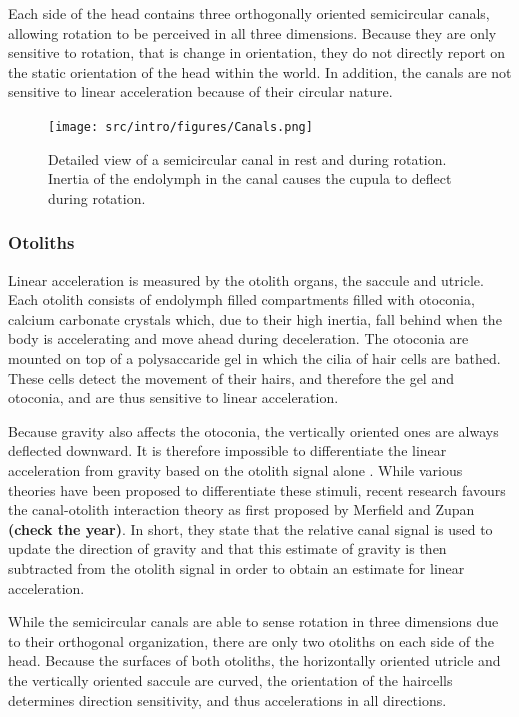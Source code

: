 Each side of the head contains three orthogonally oriented semicircular canals, allowing rotation to be perceived in all three dimensions. Because they are only sensitive to rotation, that is change in orientation, they do not directly report on the static orientation of the head within the world. In addition, the canals are not sensitive to linear acceleration because of their circular nature.

\begin{figure}
    \texttt{[image: src/intro/figures/Canals.png]}
    \caption{Detailed view of a semicircular canal  in rest and  during rotation. Inertia of the endolymph in the canal causes the cupula to deflect during rotation.}
    \label{intro:fig3}
\end{figure}


\subsubsection{Otoliths}
Linear acceleration is measured by the otolith organs, the saccule and utricle. Each otolith consists of endolymph filled compartments filled with otoconia, calcium carbonate crystals which, due to their high inertia, fall behind when the body is accelerating and move ahead during deceleration. The otoconia are mounted on top of a polysaccaride gel in which the cilia of hair cells are bathed. These cells detect the movement of their hairs, and therefore the gel and otoconia, and are thus sensitive to linear acceleration.

Because gravity also affects the otoconia, the vertically oriented ones are always deflected downward. It is therefore impossible to differentiate the linear acceleration from gravity based on the otolith signal alone . While various theories  have been proposed to differentiate these stimuli, recent research favours the canal-otolith interaction theory as first proposed by Merfield and Zupan \textbf{(check the year)}. In short, they state that the relative canal signal is used to update the direction of gravity and that this estimate of gravity is then subtracted from the otolith signal in order to obtain an estimate for linear acceleration.

While the semicircular canals are able to sense rotation in three dimensions due to their orthogonal organization, there are only two otoliths on each side of the head. Because the surfaces of both otoliths, the horizontally oriented utricle and the vertically oriented saccule are curved, the orientation of the haircells determines direction sensitivity, and thus accelerations in all directions.


